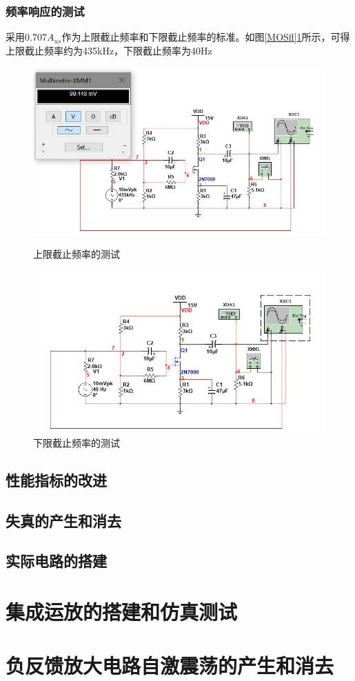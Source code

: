 \documentclass[UTF8,a4paper]{ctexart}
\begin{document}
\subsubsection{频率响应的测试}
采用$0.707A_{us}$作为上限截止频率和下限截止频率的标准。如图\ref{MOSfl}\ref{MOSfh}所示，可得上限截止频率约为435kHz，下限截止频率为40Hz
\begin{figure}
\centering
\includegraphics[width=\textwidth]{2-4fh.jpg}
\caption{上限截止频率的测试}
\label{MOSfl}
\includegraphics[width=\textwidth]{2-4fl.jpg}
\caption{下限截止频率的测试}
\label{MOSfh}
\end{figure}
\subsection{性能指标的改进}
\subsection{失真的产生和消去}
\subsection{实际电路的搭建}
\section{集成运放的搭建和仿真测试}
\section{负反馈放大电路自激震荡的产生和消去}
\end{document}
